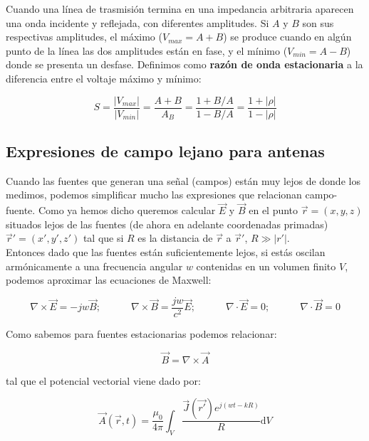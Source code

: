\documentclass[12pt]{article}
\newcommand{\D}{\mathrm{d}}
\newcommand{\tquad}{\quad \quad \quad}
\newcommand{\rota}{\nabla \times}
\newcommand{\dive}{\nabla \cdot}
\begin{document}
Cuando una línea de trasmisión termina en una impedancia arbitraria aparecen una onda incidente y reflejada, con diferentes amplitudes. Si $A$ y $B$ son sus respectivas amplitudes, el máximo ($V_{max} = A+B$) se produce cuando en algún punto de la línea las dos amplitudes están en fase, y el mínimo ($V_{min} = A-B$) donde se presenta un desfase. Definimos como \textbf{razón de onda estacionaria} a la diferencia entre el voltaje máximo y mínimo:

\begin{equation}
S = \dfrac{|V_{max}|}{|V_{min}|} = \dfrac{A+B}{A_B} = \dfrac{1+B/A}{1-B/A} = \dfrac{1+|\rho |}{1-|\rho|}
\end{equation}

\subsection{Expresiones de campo lejano para antenas}

Cuando las fuentes que generan una señal (campos) están muy lejos de donde los medimos, podemos simplificar mucho las expresiones que relacionan campo-fuente. Como ya hemos dicho queremos calcular $\vec{E}$ y $\vec{B}$ en el punto $\vec{r} = (x,y,z)$ situados lejos de las fuentes (de ahora en adelante coordenadas primadas) $\vec{r}'=(x',y',z')$ tal que si $R$ es la distancia de $\vec{r}$ a $\vec{r}'$, $R \gg |r'|$.\\


Entonces dado que las fuentes están suficientemente lejos,  si estás oscilan armónicamente a una frecuencia angular $w$ contenidas en un volumen finito $V$, podemos aproximar las ecuaciones de Maxwell:

\begin{equation}
\rota \vec{E} = -  j w \vec{B}; \tquad \rota \vec{B}  = \dfrac{j w}{c^2} \vec{E}; \tquad \dive \vec{E} = 0; \tquad \dive \vec{B} = 0
\end{equation}

Como sabemos para fuentes estacionarias podemos relacionar:

\begin{equation}
\vec{B} = \rota \vec{A}
\end{equation}

tal que el potencial vectorial viene dado por:

\begin{equation}
\vec{A}(\vec{r},t) = \dfrac{\mu_0}{4 \pi} \int_V \dfrac{\vec{J} (\vec{r'}) e^{j(wt-kR)}}{R} \D V
\end{equation}
\end{document}
